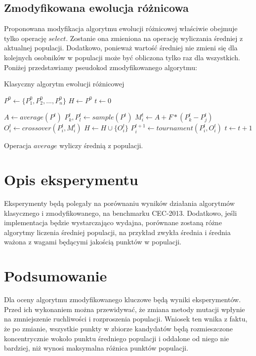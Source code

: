\documentclass{scrartcl}
\begin{document}
\pagebreak
\subsection{Zmodyfikowana ewolucja różnicowa}

Proponowana modyfikacja algorytmu ewolucji różnicowej właściwie obejmuje tylko operację $select$. Zostanie ona zmieniona na operację wyliczania średniej z aktualnej populacji. Dodatkowo, ponieważ wartość średniej nie zmieni się dla kolejnych osobników w populacji może być obliczona tylko raz dla wszystkich. Poniżej przedstawiamy pseudokod zmodyfikowanego algorytmu:

\vspace{5mm}

\begin{algorithm}
\caption{Klasyczny algorytm ewolucji różnicowej}\label{euclid}
\begin{algorithmic}

\State $P^0 \gets \{ P^0_1, P^0_2, ... , P^0_n\}$
\State $H \gets P^0$
\State $t \gets 0$

\State $A \gets average(P^t)$
\vspace{1mm}
\State $P^t_k, P^t_l \gets sample(P^t)$
\vspace{1mm}
\State $M^t_i \gets A + F * (P^t_k - P^t_j)$
\vspace{1mm}
\State $O^t_i \gets crossover(P^t_i, M^t_i)$
\vspace{1mm}
\State $H \gets H \cup \{O^t_i\}$
\vspace{1mm}
\State $P^{t+1}_i \gets tournament(P^t_i, O^t_i)$
\vspace{1mm}
\EndFor
\State $t \gets t+1$
\EndWhile

\EndProcedure
\end{algorithmic}
\end{algorithm}

Operacja $average$ wyliczy średnią z populacji.

\section{Opis eksperymentu}

Eksperymenty będą polegały na porównaniu wyników działania algorytmów klasycznego i zmodyfikowanego, na benchmarku CEC-2013. Dodatkowo, jeśli implementacja będzie wystarczająco wydajna, porównane zostaną różne algorytmy liczenia średniej populacji, na przykład zwykła średnia i średnia ważona z wagami będącymi jakością punktów w populacji.

\section{Podsumowanie}

Dla oceny algorytmu zmodyfikowanego kluczowe będą wyniki eksperymentów. Przed ich wykonaniem można przewidywać, że zmiana metody mutacji wpłynie na zmniejszenie ruchliwości i rozproszenia populacji. Wniosek ten wnika z faktu, że po zmianie, wszystkie punkty w zbiorze kandydatów będą rozmieszczone koncentrycznie wokoło punktu średniego populacji i oddalone od niego nie bardziej, niż wynosi maksymalna różnica punktów populacji.
\end{document}
